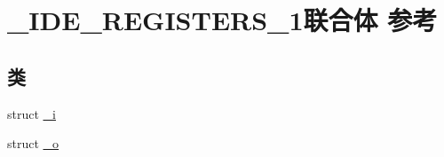 \hypertarget{struct___i_d_e___r_e_g_i_s_t_e_r_s__1}{}\section{\+\_\+\+I\+D\+E\+\_\+\+R\+E\+G\+I\+S\+T\+E\+R\+S\+\_\+1联合体 参考}
\label{struct___i_d_e___r_e_g_i_s_t_e_r_s__1}
\subsection*{类}
\begin{DoxyCompactItemize}
\item 
struct \hyperlink{struct___i_d_e___r_e_g_i_s_t_e_r_s__1_1_1__i}{\+\_\+i}
\item 
struct \hyperlink{struct___i_d_e___r_e_g_i_s_t_e_r_s__1_1_1__o}{\+\_\+o}
\end{DoxyCompactItemize}
